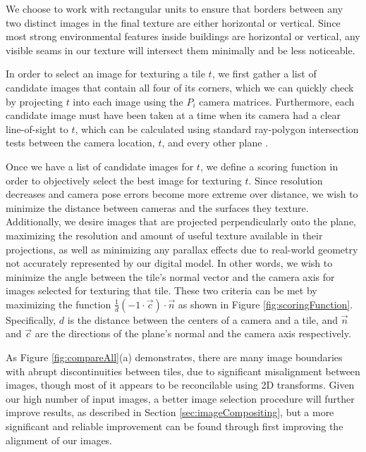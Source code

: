 \documentclass[]{spie}  %
\begin{document}
We choose to work with rectangular units to ensure that borders
between any two distinct images in the final texture are either
horizontal or vertical. Since most strong environmental features
inside buildings are horizontal or vertical, any visible seams in our
texture will intersect them minimally and be less noticeable.

In order to select an image for texturing a tile $t$, we first gather
a list of candidate images that contain all four of its corners, which
we can quickly check by projecting $t$ into each image using the $P_i$
camera matrices. Furthermore, each candidate image must have been
taken at a time when its camera had a clear line-of-sight to $t$,
which can be calculated using standard ray-polygon intersection tests
between the camera location, $t$, and every other plane
\cite{rayintersection}.

Once we have a list of candidate images for $t$, we define a scoring
function in order to objectively select the best image for texturing
$t$. Since resolution decreases and camera pose errors become more
extreme over distance, we wish to minimize the distance between
cameras and the surfaces they texture. Additionally, we desire images
that are projected perpendicularly onto the plane, maximizing the
resolution and amount of useful texture available in their
projections, as well as minimizing any parallax effects due to
real-world geometry not accurately represented by our digital
model. In other words, we wish to minimize the angle between the
tile's normal vector and the camera axis for images selected for
texturing that tile. These two criteria can be met by maximizing the
function $\frac{1}{d} (-1 \cdot \vec{c}) \cdot \vec{n}$ as shown in
Figure \ref{fig:scoringFunction}. Specifically, $d$ is the distance
between the centers of a camera and a tile, and $\vec{n}$ and
$\vec{c}$ are the directions of the plane's normal and the camera axis
respectively.


As Figure \ref{fig:compareAll}(a) demonstrates, there are many image
boundaries with abrupt discontinuities between tiles, due to
significant misalignment between images, though most of it appears to
be reconcilable using 2D transforms. Given our high number of input
images, a better image selection procedure will further improve
results, as described in Section \ref{sec:imageCompositing}, but a
more significant and reliable improvement can be found through first
improving the alignment of our images.
\end{document}
